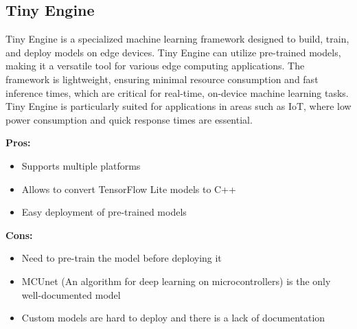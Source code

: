 \subsection*{Tiny Engine}
\label{tiny-engine}
Tiny Engine\cite{site:tinyengine}\cite{lin2022ondevice} is a specialized machine learning framework designed to build, train, and deploy models on edge devices. Tiny Engine can utilize pre-trained models, making it a versatile tool for various edge computing applications. The framework is lightweight, ensuring minimal resource consumption and fast inference times, which are critical for real-time, on-device machine learning tasks. Tiny Engine is particularly suited for applications in areas such as IoT, where low power consumption and quick response times are essential.

\textbf{Pros:}
\begin{itemize}
    \item Supports multiple platforms
    \item Allows to convert TensorFlow Lite models to C++
    \item Easy deployment of pre-trained models
\end{itemize}
\textbf{Cons:}
\begin{itemize}
    \item Need to pre-train the model before deploying it
    \item MCUnet\cite{lin2020mcunet} (An algorithm for deep learning on microcontrollers) is the only well-documented model
    \item Custom models are hard to deploy and there is a lack of documentation
\end{itemize}



